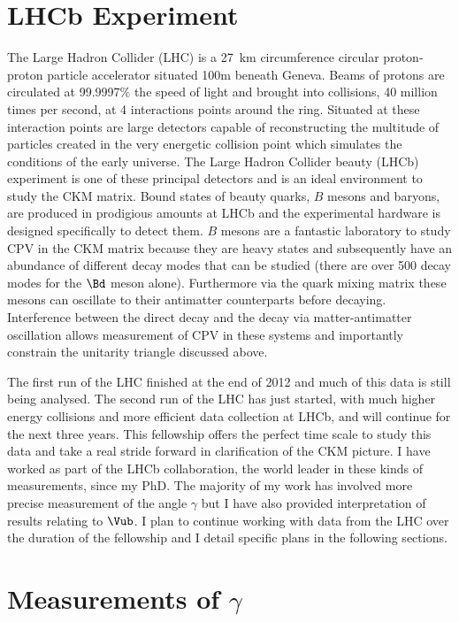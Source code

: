 \documentclass[a4paper, 10pt]{article}
\begin{document}
\section*{LHCb Experiment}

The Large Hadron Collider (LHC) is a 27~km circumference circular proton-proton particle accelerator situated 100m beneath Geneva. Beams of protons are circulated at 99.9997\% the speed of light 
and brought into collisions, 40 million times per second, at 4 interactions points around the ring. Situated at these interaction points are large detectors capable of reconstructing the multitude of particles created in the very energetic collision point which simulates the conditions of the early universe. The Large Hadron Collider beauty (LHCb) experiment is one of these principal detectors and is an ideal environment to study the CKM matrix. Bound states of beauty quarks, $B$ mesons and baryons,
are produced in prodigious amounts at LHCb and the experimental hardware is designed specifically to detect them. $B$ mesons are a fantastic laboratory to study CPV in the CKM matrix because they are heavy states and subsequently have an abundance of different decay modes that can be studied (there are over 500 decay modes for the $\Bd$ meson alone). Furthermore via the quark mixing matrix these mesons can oscillate to their antimatter counterparts before decaying. Interference between the direct decay and the decay via matter-antimatter oscillation allows measurement of CPV in these systems and importantly constrain the unitarity triangle discussed above. 

The first run of the LHC finished at the end of 2012 and much of this data is still being analysed. The second run of the LHC has just started, with much higher energy collisions and more efficient data  collection at LHCb, and will continue for the next three years. This fellowship offers the perfect time scale to study this data and take a real stride forward in clarification of the CKM picture. I have worked as part of the LHCb collaboration, the world leader in these kinds of measurements, since my PhD. The majority of my work has involved more precise measurement of the angle $\gamma$ but I have also provided interpretation of results relating to $\Vub$. I plan to continue working with data from the LHC over the duration of the fellowship and I detail specific plans in the following sections.

\section*{Measurements of $\gamma$}
\end{document}
